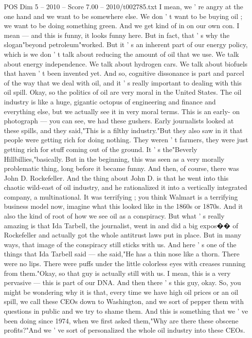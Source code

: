 \begin{textsample}{POS Dim 5 – 2010 – Score 7.00 – 2010/t002785.txt}
I mean, we ' re angry at the one hand and we want to be somewhere else.
We don ' t want to be buying oil ; we want to be doing something green.
And we get kind of in on our own con.
I mean — and this is funny, it looks funny here.
But in fact, that ' s why the slogan"beyond petroleum"worked.
But it ' s an inherent part of our energy policy, which is we don ' t talk about reducing the amount of oil that we use.
We talk about energy independence.
We talk about hydrogen cars.
We talk about biofuels that haven ' t been invented yet.
And so, cognitive dissonance is part and parcel of the way that we deal with oil, and it ' s really important to dealing with this oil spill.
Okay, so the politics of oil are very moral in the United States.
The oil industry is like a huge, gigantic octopus of engineering and finance and everything else, but we actually see it in very moral terms.
This is an early- on photograph — you can see, we had these gushers.
Early journalists looked at these spills, and they said,"This is a filthy industry."But they also saw in it that people were getting rich for doing nothing.
They weren ' t farmers, they were just getting rich for stuff coming out of the ground.
It ' s the"Beverly Hillbillies,"basically.
But in the beginning, this was seen as a very morally problematic thing, long before it became funny.
And then, of course, there was John D.
Rockefeller.
And the thing about John D. is that he went into this chaotic wild-east of oil industry, and he rationalized it into a vertically integrated company, a multinational.
It was terrifying ; you think Walmart is a terrifying business model now, imagine what this looked like in the 1860s or 1870s.
And it also the kind of root of how we see oil as a conspiracy.
But what ' s really amazing is that Ida Tarbell, the journalist, went in and did a big expos{\EmojiFont �}{\EmojiFont �} of Rockefeller and actually got the whole antitrust laws put in place.
But in many ways, that image of the conspiracy still sticks with us.
And here ' s one of the things that Ida Tarbell said — she said,"He has a thin nose like a thorn.
There were no lips.
There were puffs under the little colorless eyes with creases running from them."Okay, so that guy is actually still with us.
I mean, this is a very pervasive — this is part of our DNA.
And then there ' s this guy, okay.
So, you might be wondering why it is that, every time we have high oil prices or an oil spill, we call these CEOs down to Washington, and we sort of pepper them with questions in public and we try to shame them.
And this is something that we ' ve been doing since 1974, when we first asked them,"Why are there these obscene profits?"And we ' ve sort of personalized the whole oil industry into these CEOs.

\end{textsample}
